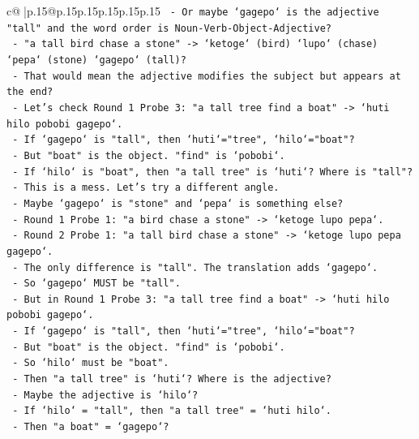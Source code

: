 \documentclass{article}
\begin{document}
{\begin{supertabular}{c@{$\;$}|p{.15\linewidth}@{}p{.15\linewidth}p{.15\linewidth}p{.15\linewidth}p{.15\linewidth}p{.15\linewidth}}
{{{\texttt{          {-} Or maybe `gagepo` is the adjective "tall" and the word order is Noun{-}Verb{-}Object{-}Adjective?} \\
\texttt{          {-} "a tall bird chase a stone" {-}> `ketoge` (bird) `lupo` (chase) `pepa` (stone) `gagepo` (tall)?} \\
\texttt{          {-} That would mean the adjective modifies the subject but appears at the end?} \\
\texttt{          {-} Let's check Round 1 Probe 3: "a tall tree find a boat" {-}> `huti hilo pobobi gagepo`.} \\
\texttt{          {-} If `gagepo` is "tall", then `huti`="tree", `hilo`="boat"?} \\
\texttt{          {-} But "boat" is the object. "find" is `pobobi`.} \\
\texttt{          {-} If `hilo` is "boat", then "a tall tree" is `huti`? Where is "tall"?} \\
\texttt{          {-} This is a mess. Let's try a different angle.} \\
\texttt{          {-} Maybe `gagepo` is "stone" and `pepa` is something else?} \\
\texttt{          {-} Round 1 Probe 1: "a bird chase a stone" {-}> `ketoge lupo pepa`.} \\
\texttt{          {-} Round 2 Probe 1: "a tall bird chase a stone" {-}> `ketoge lupo pepa gagepo`.} \\
\texttt{          {-} The only difference is "tall". The translation adds `gagepo`.} \\
\texttt{          {-} So `gagepo` MUST be "tall".} \\
\texttt{          {-} But in Round 1 Probe 3: "a tall tree find a boat" {-}> `huti hilo pobobi gagepo`.} \\
\texttt{          {-} If `gagepo` is "tall", then `huti`="tree", `hilo`="boat"?} \\
\texttt{          {-} But "boat" is the object. "find" is `pobobi`.} \\
\texttt{          {-} So `hilo` must be "boat".} \\
\texttt{          {-} Then "a tall tree" is `huti`? Where is the adjective?} \\
\texttt{          {-} Maybe the adjective is `hilo`?} \\
\texttt{          {-} If `hilo` = "tall", then "a tall tree" = `huti hilo`.} \\
\texttt{          {-} Then "a boat" = `gagepo`?} \\
}}}
\end{supertabular}}
\end{document}
